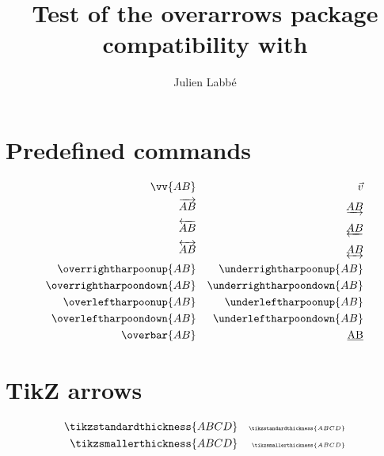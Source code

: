 \documentclass{article}
\title{Test of the \textsf{overarrows} package\\compatibility with \pkg{unicode-math}}
\author{Julien Labb\'e}
\begin{document}
\maketitle

\section*{Predefined commands}

\begin{dispExample}
\begin{align*}
  \vv{AB}                   &  & \vec{v}                    \\
  \overrightarrow{AB}       &  & \underrightarrow{AB}       \\
  \overleftarrow{AB}        &  & \underleftarrow{AB}        \\
  \overleftrightarrow{AB}   &  & \underleftrightarrow{AB}   \\
  \overrightharpoonup{AB}   &  & \underrightharpoonup{AB}   \\
  \overrightharpoondown{AB} &  & \underrightharpoondown{AB} \\
  \overleftharpoonup{AB}    &  & \underleftharpoonup{AB}    \\
  \overleftharpoondown{AB}  &  & \underleftharpoondown{AB}  \\
  \overbar{AB}              &  & \underbar{AB}
\end{align*}
\end{dispExample}

\section*{TikZ arrows}

\begin{dispExample}
\begin{align*}
  \tikzstandardthickness{ABCD} & &
  \scriptscriptstyle \tikzstandardthickness{ABCD} \\
  \tikzsmallerthickness{ABCD} & &
  \scriptscriptstyle \tikzsmallerthickness{ABCD}
\end{align*}
\end{dispExample}
\end{document}
